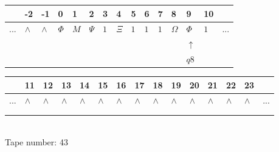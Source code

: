 \documentclass[11pt]{article}
\begin{document}
\begin{table}[H]
\centering
\begin{tabular}{lllllllllllllll}
 & -2 & -1 & 0 & 1 & 2 & 3 & 4 & 5 & 6 & 7 & 8 & 9 & 10 & \\
\hline
$...$ & \multicolumn{1}{|l|}{$\wedge$} & \multicolumn{1}{|l|}{$\wedge$} & \multicolumn{1}{|l|}{$\Phi$} & \multicolumn{1}{|l|}{$M$} & \multicolumn{1}{|l|}{$\Psi$} & \multicolumn{1}{|l|}{$1$} & \multicolumn{1}{|l|}{$\Xi$} & \multicolumn{1}{|l|}{$1$} & \multicolumn{1}{|l|}{$1$} & \multicolumn{1}{|l|}{$1$} & \multicolumn{1}{|l|}{$\Omega$} & \multicolumn{1}{|l|}{$\Phi$} & \multicolumn{1}{|l|}{$1$} & $...$\\
\hline
&  &  &  &  &  &  &  &  &  &  &  & $\uparrow$ &  &  \\
&  &  &  &  &  &  &  &  &  &  &  & $ q8 $ &  &  \\
\end{tabular}
\begin{tabular}{lllllllllllllll}
 & 11 & 12 & 13 & 14 & 15 & 16 & 17 & 18 & 19 & 20 & 21 & 22 & 23 & \\
\hline
$...$ & \multicolumn{1}{|l|}{$\wedge$} & \multicolumn{1}{|l|}{$\wedge$} & \multicolumn{1}{|l|}{$\wedge$} & \multicolumn{1}{|l|}{$\wedge$} & \multicolumn{1}{|l|}{$\wedge$} & \multicolumn{1}{|l|}{$\wedge$} & \multicolumn{1}{|l|}{$\wedge$} & \multicolumn{1}{|l|}{$\wedge$} & \multicolumn{1}{|l|}{$\wedge$} & \multicolumn{1}{|l|}{$\wedge$} & \multicolumn{1}{|l|}{$\wedge$} & \multicolumn{1}{|l|}{$\wedge$} & \multicolumn{1}{|l|}{$\wedge$} & $...$\\
\hline
&  &  &  &  &  &  &  &  &  &  &  &  &  &  \\
&  &  &  &  &  &  &  &  &  &  &  &  &  &  \\
\end{tabular}
\\
Tape number: 43
\noindent\makebox[\linewidth]{\hdashrule{\textwidth}{1pt}{1pt}}\end{table}
\clearpage
\end{document}

